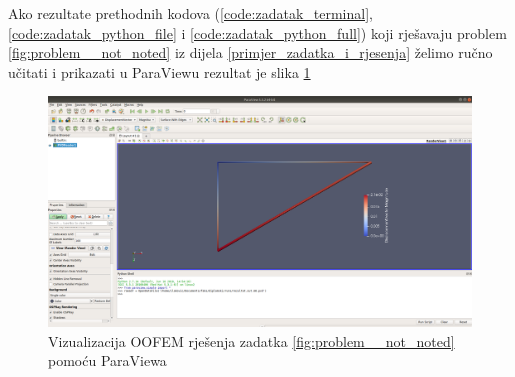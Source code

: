 \documentclass[a4paper,twoside,12pt]{memoir} %
\begin{document}
Ako rezultate prethodnih kodova (\ref{code:zadatak_terminal}, \ref{code:zadatak_python_file} i \ref{code:zadatak_python_full}) koji rješavaju problem \ref{fig:problem__not_noted} iz dijela \ref{primjer_zadatka_i_rjesenja} želimo ručno učitati i prikazati u ParaViewu rezultat je slika \ref{fig:visualization_of_zadatak_paraview}

\begin{figure}[h!t]
\begin{center}
\includegraphics[scale=0.21]{pictures/chapter_zadatak/paraview_zadatak.png}
\caption{Vizualizacija OOFEM rješenja zadatka \ref{fig:problem__not_noted} pomoću ParaViewa}
\label{fig:visualization_of_zadatak_paraview}
\end{center}
\end{figure}





\pagestyle{empty} %

\end{document}

